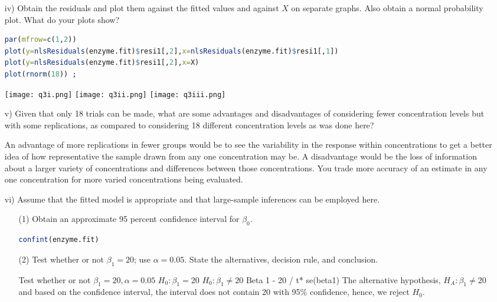 \documentclass[11pt]{report}
\begin{document}
\begin{itemize}
\item[iv) ] Obtain the residuals and plot them against the fitted values and against $X$ on separate graphs. Also obtain a normal probability plot. What do your plots show? 

\begin{lstlisting}[language=R]
par(mfrow=c(1,2))
plot(y=nlsResiduals(enzyme.fit)$resi1[,2],x=nlsResiduals(enzyme.fit)$resi1[,1])
plot(y=nlsResiduals(enzyme.fit)$resi1[,2],x=X)
plot(rnorm(18)) ;
\end{lstlisting}

\texttt{[image: q3i.png]}
\texttt{[image: q3ii.png]}
\texttt{[image: q3iii.png]}


\item[v) ] Given that only 18 trials can be made, what are some advantages and disadvantages of considering fewer concentration levels but with some replications, as compared to considering 18 different concentration levels as was done here?

An advantage of more replications in fewer groups would be to see the variability in the response within concentrations to get a better idea of how representative the sample drawn from any one concentration may be.
A disadvantage would be the loss of information about a larger variety of concentrations and differences between those concentrations. You trade more accuracy of an estimate in any one concentration for more varied concentrations being evaluated.

\item[vi) ] Assume that the fitted model is appropriate and that large-sample inferences can be employed here. 
\begin{itemize}
\item[(1) ] Obtain an approximate 95 percent confidence interval for $\beta_0$.

\begin{lstlisting}[language=R]
confint(enzyme.fit)
\end{lstlisting}

\item[(2) ] Test whether or not $\beta_1=20$; use $\alpha=0.05$. State the alternatives, decision rule, and conclusion.  

Test whether or not $\beta_1=20, \alpha = 0.05$
$H_{0}: \beta_1 = 20$ 
$H_{0}: \beta_1 \neq 20$ 
Beta 1 - 20 / t* se(beta1)
The alternative hypothesis, $H_{A}: \beta_1 \neq 20$ and based on the confidence interval, the interval does not contain 20 with 95\% confidence, hence, we reject $H_{0}$.

\end{itemize}
\end{itemize}
\end{document}
